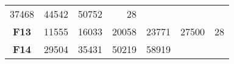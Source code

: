 \documentclass[12pt,a4paper]{article}
\begin{document}
\begin{longtable}[c]{@{}crrrrrr@{}}
\begin{minipage}[t]{0.09\columnwidth}
37468
\strut\end{minipage} &
\begin{minipage}[t]{0.10\columnwidth}\raggedleft\strut
44542
\strut\end{minipage} &
\begin{minipage}[t]{0.11\columnwidth}\raggedleft\strut
50752
\strut\end{minipage} &
\begin{minipage}[t]{0.07\columnwidth}\raggedleft\strut
28
\strut\end{minipage}\tabularnewline
\begin{minipage}[t]{0.11\columnwidth}\centering\strut
\textbf{F13}
\strut\end{minipage} &
\begin{minipage}[t]{0.08\columnwidth}\raggedleft\strut
11555
\strut\end{minipage} &
\begin{minipage}[t]{0.08\columnwidth}\raggedleft\strut
16033
\strut\end{minipage} &
\begin{minipage}[t]{0.09\columnwidth}\raggedleft\strut
20058
\strut\end{minipage} &
\begin{minipage}[t]{0.10\columnwidth}\raggedleft\strut
23771
\strut\end{minipage} &
\begin{minipage}[t]{0.11\columnwidth}\raggedleft\strut
27500
\strut\end{minipage} &
\begin{minipage}[t]{0.07\columnwidth}\raggedleft\strut
28
\strut\end{minipage}\tabularnewline
\begin{minipage}[t]{0.11\columnwidth}\centering\strut
\textbf{F14}
\strut\end{minipage} &
\begin{minipage}[t]{0.08\columnwidth}\raggedleft\strut
29504
\strut\end{minipage} &
\begin{minipage}[t]{0.08\columnwidth}\raggedleft\strut
35431
\strut\end{minipage} &
\begin{minipage}[t]{0.09\columnwidth}\raggedleft\strut
50219
\strut\end{minipage} &
\begin{minipage}[t]{0.10\columnwidth}\raggedleft\strut
58919
\strut\end{minipage} &
\begin{minipage}[t]{0.11\columnwidth}\raggedleft\strut

\end{minipage}
\end{longtable}
\end{document}
